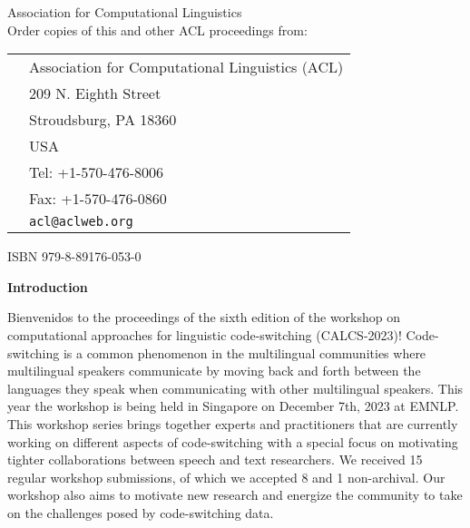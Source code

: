 \documentclass[11pt,oneside]{book}
\begin{document}
{}
\vspace*{11cm}
{\large

\noindent
{} Association for Computational Linguistics\\

\vspace*{2cm}
\noindent
Order copies of this and other ACL proceedings from:

\vspace*{1cm}
\begin{tabular}{p{1.5cm}l}
& Association for Computational Linguistics (ACL)\\
& 209 N. Eighth Street\\
& Stroudsburg, PA 18360\\
& USA\\
& Tel: +1-570-476-8006\\
& Fax: +1-570-476-0860\\
&{\tt acl@aclweb.org}\\
\end{tabular}

\vspace*{1cm}
ISBN 979-8-89176-053-0
}
\newpage


  \begin{center}
   { \Large \textbf{Introduction}}
  \end{center}
  \vspace*{0.5cm}
  Bienvenidos to the proceedings of the sixth edition of the workshop on computational approaches for linguistic code-switching (CALCS-2023)! 
Code-switching is a common phenomenon in the multilingual communities where multilingual speakers communicate by moving back and forth between the languages they speak when communicating with other multilingual speakers. 
This year the workshop is being held in Singapore on December 7th, 2023 at EMNLP. \\

This workshop series brings together experts and practitioners that are currently working on different aspects of code-switching with a special focus on motivating tighter collaborations between speech and text researchers. 
We received 15 regular workshop submissions, of which we accepted 8 and 1 non-archival. 
Our workshop also aims to motivate new research and energize the community to take on the challenges posed by code-switching data. \\
%
\end{document}
